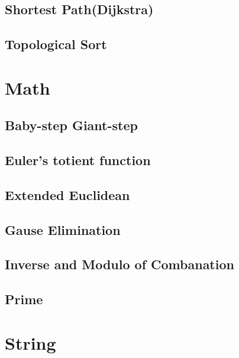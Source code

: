 \subsection{Shortest Path(Dijkstra)}
\raggedbottom
\subsection{Topological Sort}
\raggedbottom
\hrulefill
\section{Math}
\subsection{Baby-step Giant-step}
\raggedbottom
\subsection{Euler's totient function}
\raggedbottom
\subsection{Extended Euclidean}
\raggedbottom
\subsection{Gause Elimination}
\raggedbottom
\subsection{Inverse and Modulo of Combanation}
\raggedbottom
\subsection{Prime}
\raggedbottom
\hrulefill
\section{String}
